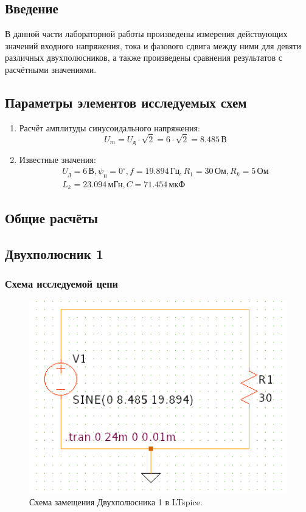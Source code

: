 \subsection{Введение}
В данной части лабораторной работы произведены измерения действующих значений входного напряжения, тока и фазового сдвига между ними для девяти различных двухполюсников, а также произведены сравнения результатов с расчётными значениями.

\subsection{Параметры элементов исследуемых схем}
\begin{enumerate}
	\item Расчёт амплитуды синусоидального напряжения:
	      \[
		      U_m =  U_{\text{д}} \cdot \sqrt{2} = 6 \cdot \sqrt{2} = 8.485 \, \text{В}
	      \]

	\item Известные значения:
	      \[
		      \begin{gathered}
			      U_{\text{д}} = 6 \, \text{В}, \psi_{\text{н}} = 0^{\circ}, f = 19.894 \, \text{Гц}, R_1 = 30 \, \text{Ом}, R_k = 5 \, \text{Ом} \\
			      L_k = 23.094 \, \text{мГн}, C = 71.454 \, \text{мкФ}
		      \end{gathered}
	      \]

\end{enumerate}

\subsection{Общие расчёты}


\subsection{Двухполюсник 1}
\subsubsection{Схема исследуемой цепи}
\begin{figure}[H]
	\centering
	\includegraphics[width=1\textwidth]{./data/schema1}
	\caption{Схема замещения Двухполюсника 1 в LTspice.}
\end{figure}
